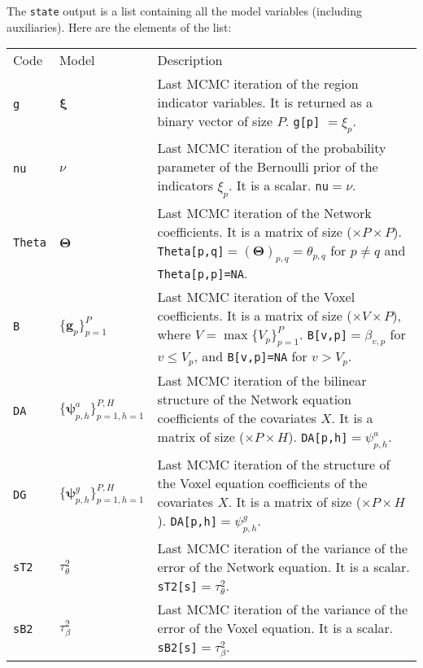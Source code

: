 \documentclass[
]{article}
\begin{document}
The \texttt{state} output is a list containing all the model variables
(including auxiliaries). Here are the elements of the list:

\begin{longtable}[]{@{}
  >{\raggedleft\arraybackslash}p{}
  >{\centering\arraybackslash}p{}
  >{\raggedright\arraybackslash}p{}@{}}
\toprule\noalign{}
\endhead
\bottomrule\noalign{}
\endlastfoot
Code & Model & Description \\
\texttt{g} & \( {\boldsymbol \xi} \) & Last MCMC iteration of the region indicator variables. It is returned as a binary
vector of size \(P\). \texttt{g{[}p{]}} \(={\xi_p}\). \\
\texttt{nu} & \(\nu\) & Last MCMC iteration of the probability parameter of the Bernoulli prior of the indicators \(\xi_p\). It is a scalar.
\texttt{nu}\(=\nu\). \\
\texttt{Theta} & \( {\boldsymbol \Theta} \) & Last MCMC iteration of the Network coefficients. It is a matrix of size (\(\times P \times P\)).
\texttt{Theta{[}p,q{]}}\(=( {\boldsymbol \Theta} )_{p,q}=\theta_{p,q}\) for \(p\neq q\) and \texttt{Theta{[}p,p{]}=NA}. \\
\texttt{B} & \(\{ {\boldsymbol g} _p\}_{p=1}^P\) & Last MCMC iteration of the Voxel coefficients. It is a matrix of size (\(\times V \times P\)), where \(V=\max\{V_p\}_{p=1}^P\).
\texttt{B{[}v,p{]}}\(=\beta_{v,p}\) for \(v \leq V_p\), and \texttt{B{[}v,p{]}=NA} for \(v > V_p\). \\
\texttt{DA} & \(\{ {\boldsymbol \psi} _{p,h}^a\}_{p=1,h=1}^{P,H}\) & Last MCMC iteration of the bilinear structure of the Network equation coefficients of the covariates \(X\). It is a matrix of
size (\(\times P \times H\)). \texttt{DA{[}p,h{]}}\(= {\psi_{p,h}^{a}}\). \\
\texttt{DG} & \(\{ {\boldsymbol \psi} _{p,h}^g\}_{p=1,h=1}^{P,H}\) & Last MCMC iteration of the structure of the Voxel equation coefficients of the covariates \(X\). It is a matrix of size
(\(\times P \times H\)). \texttt{DA{[}p,h{]}}\(= {\psi_{p,h}^{g}}\). \\
\texttt{sT2} & \(\tau^2_\theta\) & Last MCMC iteration of the variance of the error of the Network equation. It is a scalar. \texttt{sT2{[}s{]}}\(= {\tau^2_\theta}\). \\
\texttt{sB2} & \(\tau^2_\beta\) & Last MCMC iteration of the variance of the error of the Voxel equation. It is a scalar. \texttt{sB2{[}s{]}}\(= {\tau^2_\beta}\). \\

\end{longtable}
\end{document}
